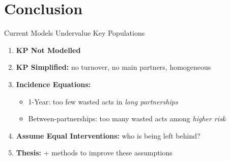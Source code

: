 \section{Conclusion}{}
\begin{frame}{Current Models Undervalue Key Populations}
  \pause
  \begin{enumerate}[<+->]
    \item \textbf{KP Not Modelled}
    \item \textbf{KP Simplified:} no turnover, no main partners, homogeneous
    \item \textbf{Incidence Equations:}
    \begin{itemize}
      \item 1-Year: too few wasted acts in \emph{long partnerships}
      \item Between-partnerships: too many wasted acts among \emph{higher risk}
    \end{itemize}
    \item \textbf{Assume Equal Interventions:} who is being left behind?
    \bigskip
    \item[\rarr]\textbf{Thesis:} + methods to improve these assumptions
  \end{enumerate}
\end{frame}
\newcommand{\thankscol}[1]{\parbox[t]{.33333\textwidth}{\vskip-\baselineskip#1}\ignorespaces}
\newcommand{\thankshead}[1]{\vskip.5\baselineskip\textbf{#1}}
\newcommand{\thankslogo}[3][0]{\vhskip{.5}{#1}\texttt{[image: \#3]}}

